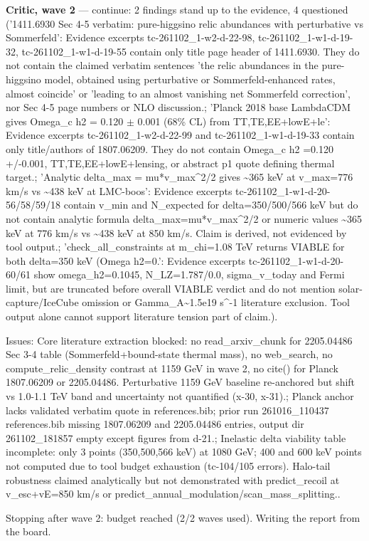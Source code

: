 \documentclass[11pt,a4paper]{article}
\begin{document}
\textbf{Critic, wave 2} --- continue: 2 findings stand up to the evidence, 4 questioned ('1411.6930 Sec 4-5 verbatim: pure-higgsino relic abundances with perturbative vs Sommerfeld': Evidence excerpts tc-261102\_1-w2-d-22-98, tc-261102\_1-w1-d-19-32, tc-261102\_1-w1-d-19-55 contain only title page header of 1411.6930. They do not contain the claimed verbatim sentences 'the relic abundances in the pure-higgsino model, obtained using perturbative or Sommerfeld-enhanced rates, almost coincide' or 'leading to an almost vanishing net Sommerfeld correction', nor Sec 4-5 page numbers or NLO discussion.; 'Planck 2018 base LambdaCDM gives Omega\_c h2 = 0.120 $\pm$ 0.001 (68\% CL) from TT,TE,EE+lowE+le': Evidence excerpts tc-261102\_1-w2-d-22-99 and tc-261102\_1-w1-d-19-33 contain only title/authors of 1807.06209. They do not contain Omega\_c h2 =0.120 +/-0.001, TT,TE,EE+lowE+lensing, or abstract p1 quote defining thermal target.; 'Analytic delta\_max = mu*v\_max\textasciicircum{}2/2 gives \textasciitilde{}365 keV at v\_max=776 km/s vs \textasciitilde{}438 keV at LMC-boos': Evidence excerpts tc-261102\_1-w1-d-20-56/58/59/18 contain v\_min and N\_expected for delta=350/500/566 keV but do not contain analytic formula delta\_max=mu*v\_max\textasciicircum{}2/2 or numeric values \textasciitilde{}365 keV at 776 km/s vs \textasciitilde{}438 keV at 850 km/s. Claim is derived, not evidenced by tool output.; 'check\_all\_constraints at m\_chi=1.08 TeV returns VIABLE for both delta=350 keV (Omega h2=0.': Evidence excerpts tc-261102\_1-w1-d-20-60/61 show omega\_h2=0.1045, N\_LZ=1.787/0.0, sigma\_v\_today and Fermi limit, but are truncated before overall VIABLE verdict and do not mention solar-capture/IceCube omission or Gamma\_A\textasciitilde{}1.5e19 s\textasciicircum{}-1 literature exclusion. Tool output alone cannot support literature tension part of claim.).

Issues: Core literature extraction blocked: no read\_arxiv\_chunk for 2205.04486 Sec 3-4 table (Sommerfeld+bound-state thermal mass), no web\_search, no compute\_relic\_density contrast at 1159 GeV in wave 2, no cite() for Planck 1807.06209 or 2205.04486. Perturbative 1159 GeV baseline re-anchored but shift vs 1.0-1.1 TeV band and uncertainty not quantified (x-30, x-31).; Planck anchor lacks validated verbatim quote in references.bib; prior run 261016\_110437 references.bib missing 1807.06209 and 2205.04486 entries, output dir 261102\_181857 empty except figures from d-21.; Inelastic delta viability table incomplete: only 3 points (350,500,566 keV) at 1080 GeV; 400 and 600 keV points not computed due to tool budget exhaustion (tc-104/105 errors). Halo-tail robustness claimed analytically but not demonstrated with predict\_recoil at v\_esc+vE=850 km/s or predict\_annual\_modulation/scan\_mass\_splitting..

Stopping after wave 2: budget reached (2/2 waves used). Writing the report from the board.
\end{document}
